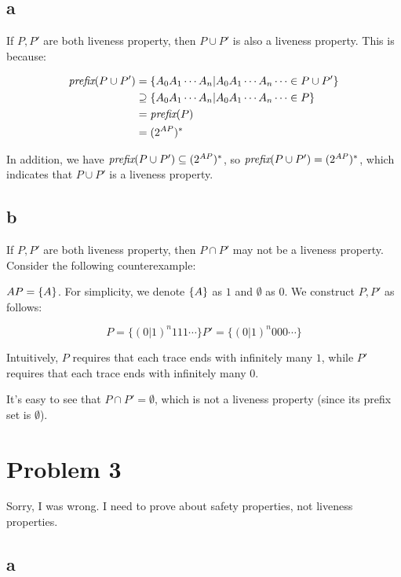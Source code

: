 \subsection{a}

If $P, P'$ are both liveness property, then $P \cup P'$ is also a liveness property.
This is because:

$$
\begin{aligned}
    \textit{prefix}(P \cup P')
    &= \{ A_0 A_1 \cdots A_n | A_0 A_1 \cdots A_n \cdots \in P \cup P' \} \\
    &\supseteq \{ A_0 A_1 \cdots A_n | A_0 A_1 \cdots A_n \cdots \in P \} \\
    &= \textit{prefix}(P) \\
    &= (2^{AP})^* \\
\end{aligned}
$$

In addition, we have $\textit{prefix}(P \cup P') \subseteq (2^{AP})^*$, so $\textit{prefix}(P \cup P') = (2^{AP})^*$,
which indicates that $P \cup P'$ is a liveness property.

\subsection{b}

If $P, P'$ are both liveness property, then $P \cap P'$ may not be a liveness property.
Consider the following counterexample:

$AP = \{A\}$. For simplicity, we denote $\{A\}$ as $1$ and $\emptyset$ as $0$. We construct $P, P'$ as follows:

$$
P  = \{ (0 | 1)^n 1 1 1 \cdots \}
P' = \{ (0 | 1)^n 0 0 0 \cdots \}
$$

Intuitively, $P$ requires that each trace ends with infinitely many $1$,
while $P'$ requires that each trace ends with infinitely many $0$.

It's easy to see that $P \cap P' = \emptyset$, which is not a liveness property
(since its prefix set is $\emptyset$).

\section{Problem 3}

Sorry, I was wrong. I need to prove about safety properties, not liveness properties.

\subsection{a}

